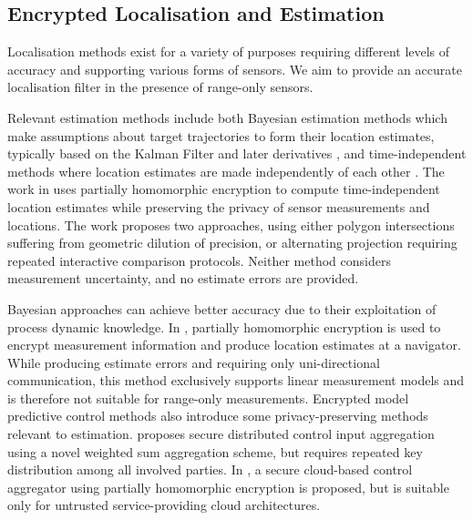 \documentclass[10pt,journal,compsoc]{IEEEtran}
\theoremstyle{definition}
\theoremstyle{definition}
\theoremstyle{remark}
\begin{document}
% 
% 

\subsection{Encrypted Localisation and Estimation}
Localisation methods exist for a variety of purposes requiring different levels of accuracy and supporting various forms of sensors. We aim to provide an accurate localisation filter in the presence of range-only sensors. 

Relevant estimation methods include both Bayesian estimation methods which make assumptions about target trajectories to form their location estimates, typically based on the Kalman Filter and later derivatives \cite{kalmanNewApproachLinear1960,mutambaraDecentralizedEstimationControl1998}, and time-independent methods where location estimates are made independently of each other \cite{alanwarPrOLocResilientLocalization2017,lazosSeRLocSecureRangeindependent2004}. The work in \cite{alanwarPrOLocResilientLocalization2017} uses partially homomorphic encryption to compute time-independent location estimates while preserving the privacy of sensor measurements and locations. The work proposes two approaches, using either polygon intersections suffering from geometric dilution of precision, or alternating projection requiring repeated interactive comparison protocols. Neither method considers measurement uncertainty, and no estimate errors are provided. 

Bayesian approaches can achieve better accuracy due to their exploitation of process dynamic knowledge. In \cite{aristovEncryptedMultisensorInformation2018}, partially homomorphic encryption is used to encrypt measurement information and produce location estimates at a navigator. While producing estimate errors and requiring only uni-directional communication, this method exclusively supports linear measurement models and is therefore not suitable for range-only measurements. Encrypted model predictive control methods \cite{farokhiPrivacyDynamicalSystems2020} also introduce some privacy-preserving methods relevant to estimation. \cite{alexandruEncryptedCooperativeControl2019} proposes secure distributed control input aggregation using a novel weighted sum aggregation scheme, but requires repeated key distribution among all involved parties. In \cite{farokhiSecurePrivateControl2017}, a secure cloud-based control aggregator using partially homomorphic encryption is proposed, but is suitable only for untrusted service-providing cloud architectures.
\end{document}
